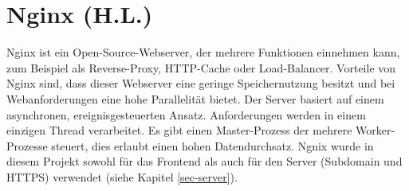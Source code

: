 \section{Nginx (H.L.)}
\label{sec-Nginx}
Nginx \cite{nginx} ist ein Open-Source-Webserver, der mehrere Funktionen einnehmen kann, zum Beispiel als Reverse-Proxy, HTTP-Cache oder Load-Balancer. Vorteile von Nginx sind, dass dieser Webserver eine geringe Speichernutzung besitzt und bei Webanforderungen eine hohe Parallelität bietet. 
Der Server basiert auf einem asynchronen, ereignisgesteuerten Ansatz. Anforderungen werden in einem einzigen Thread verarbeitet. Es gibt einen Master-Prozess der mehrere Worker-Prozesse steuert, dies erlaubt einen hohen Datendurchsatz. 
Ngnix wurde in diesem Projekt sowohl für das Frontend als auch für den Server (Subdomain und HTTPS) verwendet (siehe Kapitel \ref{sec-server}).